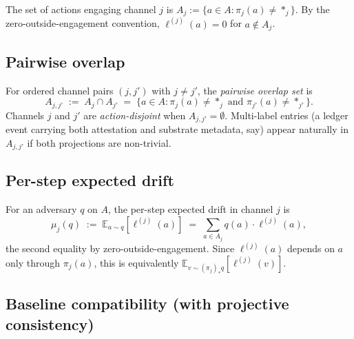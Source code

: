 \documentclass{article}
\begin{document}
The set of actions engaging channel $j$ is
$A_j := \{a \in A : \pi_j(a) \neq *_j\}$.  By the
zero-outside-engagement convention, $\ell^{(j)}(a) = 0$ for $a
\notin A_j$.

\subsection{Pairwise overlap}

For ordered channel pairs $(j, j')$ with $j \neq j'$, the
\emph{pairwise overlap set} is
\begin{equation}
  A_{j, j'} \;:=\; A_j \cap A_{j'}
  \;=\; \{a \in A : \pi_j(a) \neq *_j \text{ and } \pi_{j'}(a)
  \neq *_{j'}\}.
\end{equation}
Channels $j$ and $j'$ are \emph{action-disjoint} when $A_{j, j'} =
\emptyset$.  Multi-label entries (a ledger event carrying both
attestation and substrate metadata, say) appear naturally in
$A_{j, j'}$ if both projections are non-trivial.

\subsection{Per-step expected drift}

For an adversary $q$ on $A$, the per-step expected drift in channel
$j$ is
\begin{equation}
\label{eq:drift-def-v3}
  \mu_j(q) \;:=\; \mathbb{E}_{a \sim q}[\ell^{(j)}(a)]
  \;=\; \sum_{a \in A_j} q(a) \cdot \ell^{(j)}(a),
\end{equation}
the second equality by zero-outside-engagement.  Since
$\ell^{(j)}(a)$ depends on $a$ only through $\pi_j(a)$, this is
equivalently $\mathbb{E}_{v \sim (\pi_j)_* q}[\ell^{(j)}(v)]$.

\subsection{Baseline compatibility (with projective consistency)}
\end{document}
